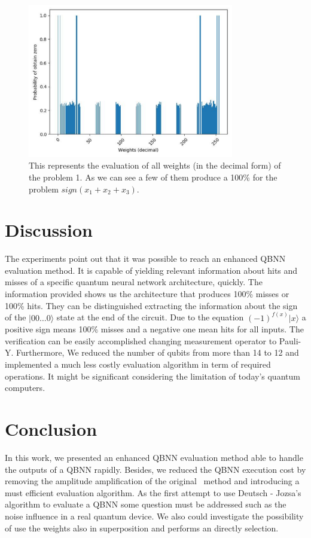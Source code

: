 \documentclass[conference]{IEEEtran}
\begin{document}
    \begin{figure}[h!]
        \centering
        \includegraphics[width=9cm, scale=0.4]{images/problem_2.pdf}
        \caption{This represents the evaluation of all weights (in the decimal form) of the problem 1.
        As we can see a few of them produce a 100\% for the problem \(sign(x_1 + x_2 + x_3)\).}\label{Fig:problem_2}
    \end{figure}

\section{Discussion}\label{sec:discussion}

The experiments point out that it was possible to reach an enhanced QBNN evaluation method.
It is capable of yielding relevant information about hits and misses of a specific quantum neural network architecture,
quickly.
The information provided shows us the architecture that produces 100\% misses or 100\% hits.
They can be distinguished extracting the information about the sign of the \(|00\dots0\rangle\) state at the end of the circuit.
Due to the equation \((-1)^{f(x)}|x\rangle\) a positive sign means 100\% misses and a negative one mean hits for all inputs.
The verification can be easily accomplished changing measurement operator to Pauli-Y\@.
Furthermore, We reduced the number of qubits from more than 14 to 12 and implemented a much less costly evaluation
algorithm in term of required operations.
It might be significant considering the limitation of today's quantum computers\cite{fawaz2019training}.



\section{Conclusion}\label{sec:conclusion}

In this work, we presented an enhanced QBNN evaluation method able to handle the outputs of a QBNN rapidly.
Besides, we reduced the QBNN execution cost by removing the amplitude amplification of the original~\cite{fawaz2019training}
method and introducing a must efficient evaluation algorithm.
As the first attempt to use Deutsch - Jozsa's algorithm to evaluate a QBNN some question must be addressed such as the
noise influence in a real quantum device.
We also could investigate the possibility of use the weights also in superposition and performs an directly selection.



\end{document}
